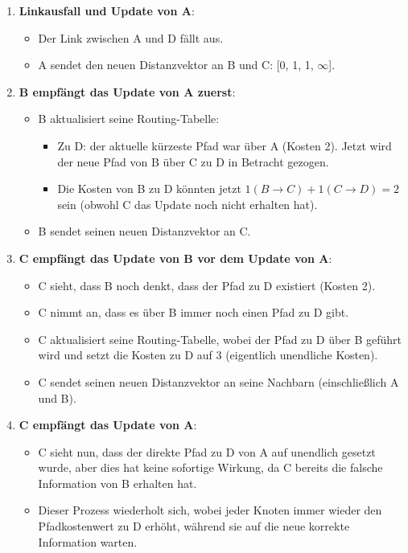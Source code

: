 \documentclass[a4paper]{scrartcl}
\begin{document}
\begin{enumerate}
    \item \textbf{Linkausfall und Update von A}:
    \begin{itemize}
        \item Der Link zwischen A und D fällt aus.
        \item A sendet den neuen Distanzvektor an B und C: [0, 1, 1, $\infty$].
    \end{itemize}
    \item \textbf{B empfängt das Update von A zuerst}:
    \begin{itemize}
        \item B aktualisiert seine Routing-Tabelle:
        \begin{itemize}
            \item Zu D: der aktuelle kürzeste Pfad war über A (Kosten 2). Jetzt wird der neue Pfad von B über C zu D in Betracht gezogen.
            \item Die Kosten von B zu D könnten jetzt \(1 (B \to C) + 1 (C \to D) = 2\) sein (obwohl C das Update noch nicht erhalten hat).
        \end{itemize}
        \item B sendet seinen neuen Distanzvektor an C.
    \end{itemize}
    \item \textbf{C empfängt das Update von B vor dem Update von A}:
    \begin{itemize}
        \item C sieht, dass B noch denkt, dass der Pfad zu D existiert (Kosten 2).
        \item C nimmt an, dass es über B immer noch einen Pfad zu D gibt.
        \item C aktualisiert seine Routing-Tabelle, wobei der Pfad zu D über B geführt wird und setzt die Kosten zu D auf 3 (eigentlich unendliche Kosten).
        \item C sendet seinen neuen Distanzvektor an seine Nachbarn (einschließlich A und B).
    \end{itemize}
    \item \textbf{C empfängt das Update von A}:
    \begin{itemize}
        \item C sieht nun, dass der direkte Pfad zu D von A auf unendlich gesetzt wurde, aber dies hat keine sofortige Wirkung, da C bereits die falsche Information von B erhalten hat.
        \item Dieser Prozess wiederholt sich, wobei jeder Knoten immer wieder den Pfadkostenwert zu D erhöht, während sie auf die neue korrekte Information warten.
    \end{itemize}
\end{enumerate}
\end{document}
